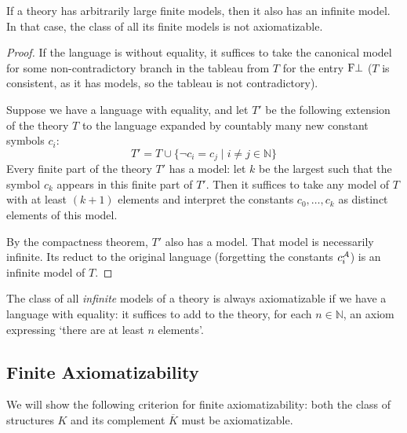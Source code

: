 \begin{theorem}
    If a theory has arbitrarily large finite models, then it also has an infinite model. In that case, the class of all its finite models is not axiomatizable.
\end{theorem}
\begin{proof}
    If the language is without equality, it suffices to take the canonical model for some non-contradictory branch in the tableau from $T$ for the entry $\mathrm{F}\bot$ ($T$ is consistent, as it has models, so the tableau is not contradictory).     
    
    Suppose we have a language with equality, and let $T'$ be the following extension of the theory $T$ to the language expanded by countably many new constant symbols $c_i$:
    $$
    T'=T \cup \{\neg c_i = c_j \mid i \neq j \in \mathbb{N}\}
    $$
    Every finite part of the theory $T'$ has a model: let $k$ be the largest such that the symbol $c_k$ appears in this finite part of $T'$. Then it suffices to take any model of $T$ with at least $(k+1)$ elements and interpret the constants $c_0, \dots, c_k$ as distinct elements of this model.

    By the compactness theorem, $T'$ also has a model. That model is necessarily infinite. Its reduct to the original language (forgetting the constants $c_i^{\mathcal{A}}$) is an infinite model of $T$.
\end{proof}

\begin{remark}
    The class of all \emph{infinite} models of a theory is always axiomatizable if we have a language with equality: it suffices to add to the theory, for each $n \in \mathbb{N}$, an axiom expressing `there are at least $n$ elements'.
\end{remark}

\subsection{Finite Axiomatizability}

We will show the following criterion for finite axiomatizability: both the class of structures $K$ and its complement $\overline{K}$ must be axiomatizable.

